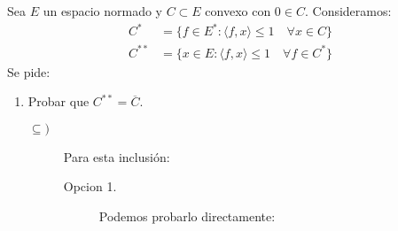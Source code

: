 \begin{ejercicio}
\end{ejercicio}

\begin{ejercicio}
\end{ejercicio}

\begin{ejercicio}
\end{ejercicio}

\begin{ejercicio}
\end{ejercicio}


\begin{ejercicio}
    Sea $E$ un espacio normado y $C\subset E$ convexo con $0\in C$. Consideramos:
    \begin{align*}
        C^\ast &= \{f\in E^\ast : \langle f,x \rangle \leq 1 \quad \forall x\in C \} \\
        C^{\ast\ast} &= \{x\in E : \langle f,x \rangle \leq 1  \quad \forall f\in C^\ast \}
    \end{align*}
    Se pide:
    \begin{enumerate}
        \item Probar que $C^{\ast\ast} = \overline{C}$.
            
            \begin{description}
                \item [$\subseteq )$] Para esta inclusión:
                    \begin{description}
                        \item [Opcion 1.] Podemos probarlo directamente:


\end{description}
\end{description}
\end{enumerate}
\end{ejercicio}
